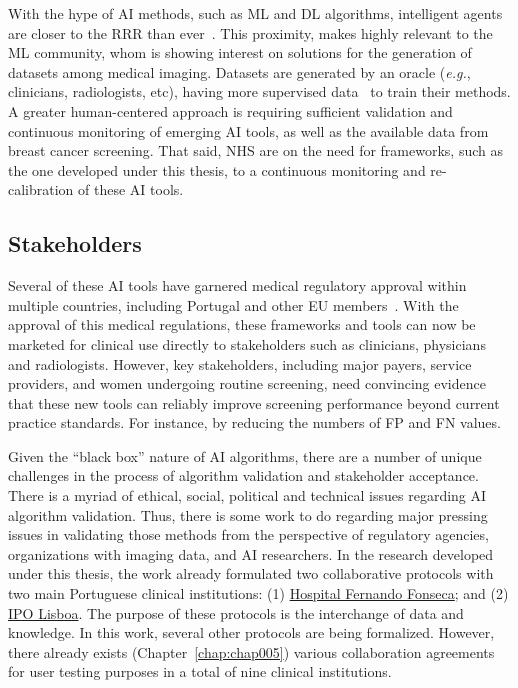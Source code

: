 With the hype of \ac{AI} methods, such as \ac{ML} and \ac{DL} algorithms, intelligent agents are closer to the \ac{RRR} than ever~\cite{He2019, DANA2020541}.
This proximity, makes highly relevant to the \ac{ML} community, whom is showing interest on solutions for the generation of datasets among medical imaging.
Datasets are generated by an oracle ({\it e.g.}, clinicians, radiologists, etc), having more supervised data~\cite{MAICAS2019101562, 10.1007/978-3-030-59719-1_44} to train their methods.
A greater human-centered approach is requiring sufficient validation and continuous monitoring of emerging \ac{AI} tools, as well as the available data from breast cancer screening.
That said, \ac{NHS} are on the need for frameworks, such as the one developed under this thesis, to a continuous monitoring and re-calibration of these \ac{AI} tools.

\subsection{Stakeholders}
\label{sec:sec004005001}

Several of these \ac{AI} tools have garnered medical regulatory approval within multiple countries, including Portugal and other \ac{EU} members~\cite{pesapane2018artificial, vayena2018machine}.
With the approval of this medical regulations, these frameworks and tools can now be marketed for clinical use directly to stakeholders such as clinicians, physicians and radiologists.
However, key stakeholders, including major payers, service providers, and women undergoing routine screening, need convincing evidence that these new tools can reliably improve screening performance beyond current practice standards.
For instance, by reducing the numbers of \ac{FP} and \ac{FN} values.

Given the ``black box'' nature of \ac{AI} algorithms, there are a number of unique challenges in the process of algorithm validation and stakeholder acceptance.
There is a myriad of ethical, social, political and technical issues regarding \ac{AI} algorithm validation.
Thus, there is some work to do regarding major pressing issues in validating those methods from the perspective of regulatory agencies, organizations with imaging data, and \ac{AI} researchers.
In the research developed under this thesis, the work already formulated two collaborative protocols with two main Portuguese clinical institutions: (1) \href{https://hff.min-saude.pt/}{Hospital Fernando Fonseca}; and (2) \href{http://www.ipolisboa.min-saude.pt/}{IPO Lisboa}.
The purpose of these protocols is the interchange of data and knowledge.
In this work, several other protocols are being formalized.
However, there already exists (Chapter~\ref{chap:chap005}) various collaboration agreements for user testing purposes in a total of nine clinical institutions.

